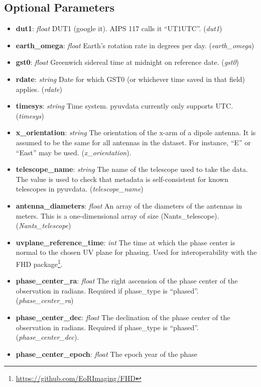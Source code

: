 \documentclass[11pt, oneside]{article}
\begin{document}
\subsection{Optional Parameters}
\label{sec:opt_params}
\begin{itemize}
\item \textbf{dut1}: \textit{float} DUT1 (google it). AIPS 117 calls it
  ``UT1UTC''. (\textit{dut1})
\item \textbf{earth\_omega}: \textit{float} Earth's rotation rate in degrees per
  day. (\textit{earth\_omega})
\item \textbf{gst0}: \textit{float} Greenwich sidereal time at midnight on
  reference date. (\textit{gst0})
\item \textbf{rdate}: \textit{string} Date for which GST0 (or whichever time
  saved in that field) applies. (\textit{rdate})
\item \textbf{timesys}: \textit{string} Time system. pyuvdata currently only
  supports UTC. (\textit{timesys})
\item \textbf{x\_orientation}: \textit{string} The orientation of the x-arm of a
  dipole antenna. It is assumed to be the same for all antennas in the
  dataset. For instance, ``E'' or ``East'' may be
  used. (\textit{x\_orientation}).
\item \textbf{telescope\_name}: \textit{string} The name of the telescope used
  to take the data. The value is used to check that metadata is self-consistent
  for known telescopes in pyuvdata. (\textit{telescope\_name})
\item \textbf{antenna\_diameters}: \textit{float} An array of the diameters of
  the antennas in meters. This is a one-dimensional array of size
  (Nants\_telescope). (\textit{Nants\_telescope})
\item \textbf{uvplane\_reference\_time}: \textit{int} The time at which the
  phase center is normal to the chosen UV plane for phasing. Used for
  interoperability with the FHD
  package\footnote{\url{https://github.com/EoRImaging/FHD}}.
\item \textbf{phase\_center\_ra}: \textit{float} The right ascension of the
  phase center of the observation in radians. Required if phase\_type is
  ``phased''. (\textit{phase\_center\_ra})
\item \textbf{phase\_center\_dec}: \textit{float} The declination of the phase
  center of the observation in radians. Required if phase\_type is
  ``phased''. (\textit{phase\_center\_dec}).
\item \textbf{phase\_center\_epoch}: \textit{float} The epoch year of the phase

\end{itemize}
\end{document}
